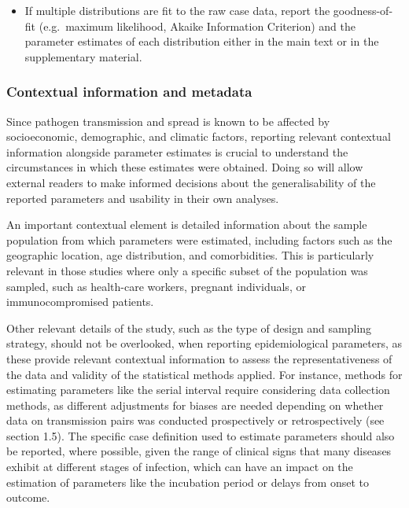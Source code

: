 \documentclass[
  10pt,
  letterpaper,
]{article}
\providecommand{\tightlist}{%
  \setlength{\itemsep}{0pt}\setlength{\parskip}{0pt}}\usepackage{longtable,booktabs,array}
\begin{document}
\begin{itemize}
\tightlist
\item
  If multiple distributions are fit to the raw case data, report the
  goodness-of-fit (e.g.~maximum likelihood, Akaike Information
  Criterion) and the parameter estimates of each distribution either in
  the main text or in the supplementary material.
\end{itemize}

\subsubsection{Contextual information and
metadata}\label{contextual-information-and-metadata}

Since pathogen transmission and spread is known to be affected by
socioeconomic, demographic, and climatic factors, reporting relevant
contextual information alongside parameter estimates is crucial to
understand the circumstances in which these estimates were obtained.
Doing so will allow external readers to make informed decisions about
the generalisability of the reported parameters and usability in their
own analyses.

An important contextual element is detailed information about the sample
population from which parameters were estimated, including factors such
as the geographic location, age distribution, and comorbidities. This is
particularly relevant in those studies where only a specific subset of
the population was sampled, such as health-care workers, pregnant
individuals, or immunocompromised patients.

Other relevant details of the study, such as the type of design and
sampling strategy, should not be overlooked, when reporting
epidemiological parameters, as these provide relevant contextual
information to assess the representativeness of the data and validity of
the statistical methods applied. For instance, methods for estimating
parameters like the serial interval require considering data collection
methods, as different adjustments for biases are needed depending on
whether data on transmission pairs was conducted prospectively or
retrospectively (see section 1.5). The specific case definition used to
estimate parameters should also be reported, where possible, given the
range of clinical signs that many diseases exhibit at different stages
of infection, which can have an impact on the estimation of parameters
like the incubation period or delays from onset to outcome.
\end{document}
